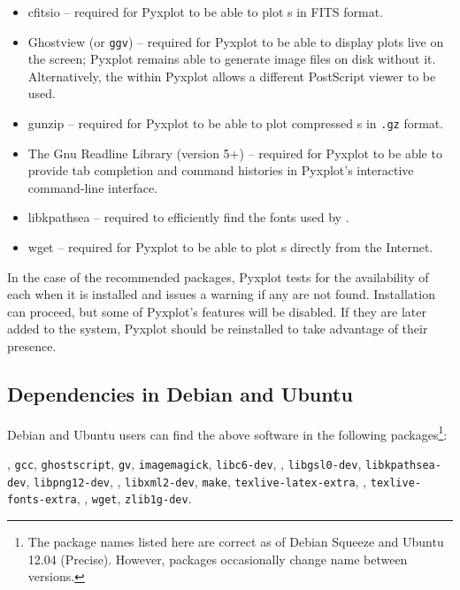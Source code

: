 \vspace{0.5cm}
\begin{itemize}
\item cfitsio -- required for Pyxplot to be able to plot \datafile s in FITS format.
\item Ghostview  (or {\tt ggv}) -- required for Pyxplot to be able to display plots live on the screen; Pyxplot remains able to generate image files on disk without it. Alternatively, the  within Pyxplot allows a different PostScript viewer to be used.
\item gunzip  -- required for Pyxplot to be able to plot compressed \datafile s in {\tt .gz} format.
\item The Gnu Readline Library (version 5+)  -- required for Pyxplot to be able to provide tab completion and command histories in Pyxplot's interactive command-line interface.
\item libkpathsea  -- required to efficiently find the fonts used by \latexdcf.
\item wget  -- required for Pyxplot to be able to plot \datafile s directly from the Internet.
\end{itemize}
\vspace{0.5cm}

\noindent In the case of the recommended packages, Pyxplot tests for the
availability of each when it is installed and issues a warning if any are not
found. Installation can proceed, but some of Pyxplot's features will be
disabled. If they are later added to the system, Pyxplot should be reinstalled
to take advantage of their presence.

\subsection{Dependencies in Debian and Ubuntu}

Debian and Ubuntu users can find the above software in the following
packages\footnote{The package names listed here are correct as of Debian
Squeeze and Ubuntu 12.04 (Precise). However, packages occasionally change name
between versions.}: 

\vspace{2mm}
, {\tt gcc}, {\tt ghostscript}, {\tt gv}, {\tt imagemagick}, {\tt libc6-dev},\newline
{}, {\tt libgsl0-dev}, {\tt libkpathsea-dev}, {\tt libpng12-dev},\newline
{}, {\tt libxml2-dev}, {\tt make}, {\tt texlive-latex-extra},\newline
{}, {\tt texlive-fonts-extra},\newline
{}, {\tt wget}, {\tt zlib1g-dev}.
\vspace{2mm}

